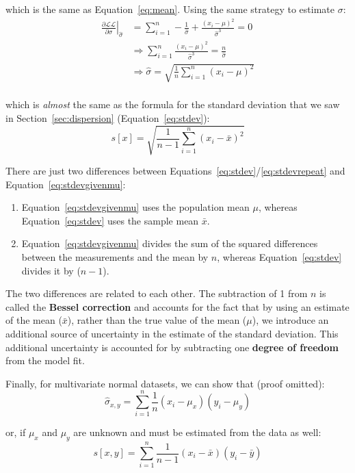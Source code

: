 \noindent which is the same as Equation~\ref{eq:mean}. Using the same
strategy to estimate $\sigma$:
\begin{equation}
  \label{eq:stdevgivenmu}
  \begin{split}
    \left.\frac{\partial{\mathcal{LL}}}{\partial{\sigma}}\right|_{\hat{\sigma}}
    & = \sum\limits_{i=1}^{n} - \frac{1}{\hat{\sigma}} +
    \frac{(x_i-\mu)^2}{\hat{\sigma}^3} = 0\\
    & \Rightarrow  \sum\limits_{i=1}^{n} \frac{(x_i-\mu)^2}{\hat{\sigma}^3} =
    \frac{n}{\hat{\sigma}} \\
    & \Rightarrow \hat{\sigma} =
    \sqrt{\frac{1}{n}\sum\limits_{i=1}^{n}(x_i-\mu)^2}\\
  \end{split}
\end{equation}

\noindent which is \emph{almost} the same as the formula for the
standard deviation that we saw in Section~\ref{sec:dispersion}
(Equation~\ref{eq:stdev}):
\begin{equation}
  s[x] = \sqrt{\frac{1}{n-1}\sum\limits_{i=1}^{n}(x_i-\bar{x})^2}
  \label{eq:stdevrepeat}
\end{equation}

There are just two differences between
Equations~\ref{eq:stdev}/\ref{eq:stdevrepeat} and
Equation~\ref{eq:stdevgivenmu}:
\begin{enumerate}
\item Equation~\ref{eq:stdevgivenmu} uses the population mean $\mu$,
  whereas Equation~\ref{eq:stdev} uses the sample mean $\bar{x}$.
\item Equation~\ref{eq:stdevgivenmu} divides the sum of the squared
  differences between the measurements and the mean by $n$, whereas
  Equation~\ref{eq:stdev} divides it by ($n-1$).
\end{enumerate}

The two differences are related to each other. The subtraction of 1
from $n$ is called the \textbf{Bessel correction} and accounts for the
fact that by using an estimate of the mean ($\bar{x}$), rather than
the true value of the mean ($\mu$), we introduce an additional source
of uncertainty in the estimate of the standard deviation. This
additional uncertainty is accounted for by subtracting one
\textbf{degree of freedom} from the model fit.\medskip

Finally, for multivariate normal datasets, we can show that (proof
omitted):
\begin{equation}
  \hat{\sigma}_{x,y} = \sum\limits_{i=1}^{n}\frac{1}{n}(x_i-\mu_x)(y_i-\mu_y)
\end{equation}

\noindent or, if $\mu_x$ and $\mu_y$ are unknown and must be estimated
from the data as well:
\begin{equation}
  s[x,y] = \sum\limits_{i=1}^{n}\frac{1}{n-1}(x_i-\bar{x})(y_i-\bar{y})
  \label{eq:sxy}
\end{equation}
